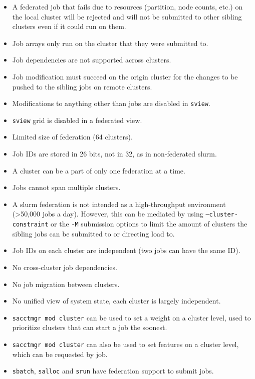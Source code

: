 \documentclass[conference]{IEEEtran}
\begin{document}
\begin{itemize}
    \item A federated job that fails due to resources (partition, node counts, etc.) on the local cluster will be rejected and will not be submitted to other sibling clusters even if it could run on them.
    \item Job arrays only run on the cluster that they were submitted to.
    \item Job dependencies are not supported across clusters.
    \item Job modification must succeed on the origin cluster for the changes to be pushed to the sibling jobs on remote clusters.
    \item Modifications to anything other than jobs are disabled in \texttt{sview}.
    \item \texttt{sview} grid is disabled in a federated view.
    \item Limited size of federation (64 clusters).
    \item Job IDs are stored in 26 bits, not in 32, as in non-federated \gls{slurm}.
    \item A cluster can be a part of only one federation at a time.
    \item Jobs cannot span multiple clusters.
    \item A \gls{slurm} federation is not intended as a high-throughput environment (\textgreater 50,000 jobs a day). However, this can be mediated by using \texttt{--cluster-constraint} or the \texttt{-M} submission options to limit the amount of clusters the sibling jobs can be submitted to or directing load to.
    \item Job IDs on each cluster are independent (two jobs can have the same ID).
    \item No cross-cluster job dependencies.
    \item No job migration between clusters.
    \item No unified view of system state, each cluster is largely independent.
    \item \texttt{sacctmgr mod cluster} can be used to set a weight on a cluster level, used to prioritize clusters that can start a job the soonest.
    \item \texttt{sacctmgr mod cluster} can also be used to set features on a cluster level, which can be requested by job.
    \item \texttt{sbatch}, \texttt{salloc} and \texttt{srun} have federation support to submit jobs.
\end{itemize}
\end{document}
